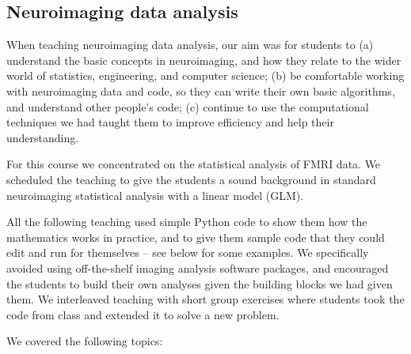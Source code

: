 

\subsection{Neuroimaging data analysis}\label{analysis}

When teaching neuroimaging data analysis, our aim was for students to
(a) understand the basic concepts in neuroimaging,
and how they relate to the wider world of statistics, engineering, and computer science;
(b) be comfortable working with neuroimaging data and code, so they can write
their own basic algorithms, and understand other people's code;
(c) continue to use the computational techniques we had taught them to improve
efficiency and help their understanding.

For this course we concentrated on the statistical analysis of FMRI data.  We
scheduled the teaching to give the students a sound background in standard
neuroimaging statistical analysis with a linear model (GLM).

All the following teaching used simple Python code to show them how the
mathematics works in practice, and to give them sample code that they could
edit and run for themselves -- see below for some examples.  We specifically
avoided using off-the-shelf imaging analysis software packages, and encouraged
the students to build their own analyses given the building blocks we had
given them.  We interleaved teaching with short group exercises where students
took the code from class and extended it to solve a new problem.

We covered the following topics:

